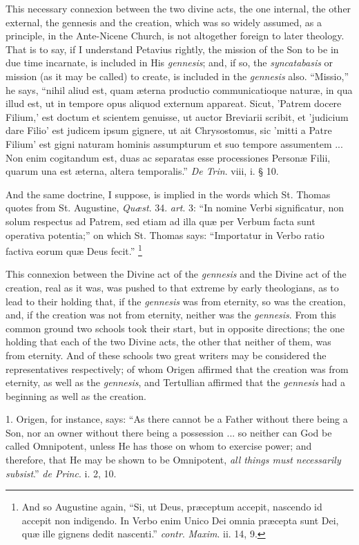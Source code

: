 This necessary connexion between the two divine acts, the one
internal, the other external, the gennesis and the creation, which was
so widely assumed, as a principle, in the Ante-Nicene Church, is not
altogether foreign to later theology. That is to say, if I understand
Petavius rightly, the mission of the Son to be in due time incarnate,
is included in His \emph{gennesis}; and, if so, the \emph{syncatabasis}
or mission (as it may be called) to create, is included in the \emph{gennesis}
also. ``Missio,'' he says, ``nihil aliud est, quam æterna
productio communicatioque naturæ, in qua illud est, ut in tempore
opus aliquod externum appareat. Sicut, 'Patrem docere Filium,' est
doctum et scientem genuisse, ut auctor Breviarii scribit, et 'judicium
dare Filio' est judicem ipsum gignere, ut ait Chrysostomus, sic 'mitti
a Patre Filium' est gigni naturam hominis assumpturum et suo tempore
assumentem ... Non enim cogitandum est, duas ac separatas esse
processiones Personæ Filii, quarum una est æterna, altera temporalis.''
\emph{De Trin}. viii, i. § 10.

And the same doctrine, I suppose, is implied in the words which St.
Thomas quotes from St. Augustine, \emph{Quæst}. 34. \emph{art}. 3:
``In nomine Verbi significatur, non solum respectus ad Patrem, sed
etiam ad illa quæ per Verbum facta sunt operativa potentia;'' on
which St. Thomas says: ``Importatur in Verbo ratio factiva
eorum quæ Deus fecit.'' \footnote{And so Augustine again, ``Si, ut Deus, præceptum accepit,
nascendo id accepit non indigendo. In Verbo enim Unico Dei omnia
præcepta sunt Dei, quæ ille gignens dedit nascenti.'' \emph{contr}.
\emph{Maxim}. ii. 14, 9.}

This connexion between the Divine act of the \emph{gennesis} and
the Divine act of the creation, real as it was, was pushed to that
extreme by early theologians, as to lead to their holding that, if the
\emph{gennesis} was from eternity, so was the creation, and, if the
creation was not from eternity, neither was the \emph{gennesis}. From
this common ground two schools took their start, but in opposite
directions; the one holding that each of the two Divine acts, the
other that neither of them, was from eternity. And of these schools
two great writers may be considered the representatives respectively;
of whom Origen affirmed that the creation was from eternity, as well
as the \emph{gennesis}, and Tertullian affirmed that the \emph{gennesis}
had a beginning as well as the creation.

1. Origen, for instance, says: ``As there cannot be a Father
without there being a Son, nor an owner without there being a
possession ... so neither can God be called Omnipotent, unless He has
those on whom to exercise power; and therefore, that He may be shown
to be Omnipotent, \emph{all things must necessarily subsist}.'' \emph{de
Princ}. i. 2, 10.

